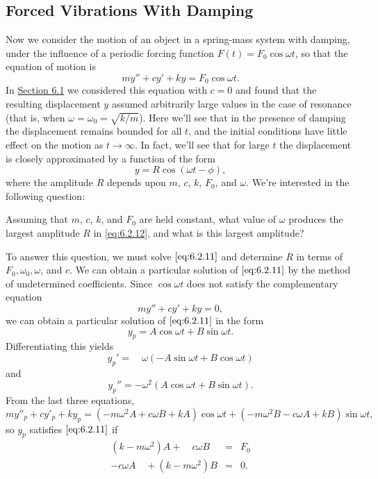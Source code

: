 \documentclass{ximera}
\begin{document}
\subsection*{Forced Vibrations With Damping}
 
Now we consider the motion of an object in a spring-mass system with
damping, under the influence of a periodic forcing function
$F(t)=F_0\cos\omega t$, so that the equation of motion is
\begin{equation}\label{eq:6.2.11}
my''+cy'+ky=F_0\cos\omega t.
\end{equation}
In \href{https://xerxes.ximera.org/differentialequations/main/springProblemsI/springProblemsI}{Section 6.1} we considered this equation with $c=0$ and
found that the resulting displacement $y$ assumed arbitrarily large
values in the case of resonance   (that is, when
$\omega=\omega_0=\sqrt{k/m}$). Here we'll see that in the presence
of damping the displacement remains bounded for all $t$, and the
initial conditions have little effect on the motion as $t\rightarrow\infty$.
In fact, we'll see that for large $t$ the displacement is closely
approximated by a function of the form
\begin{equation}\label{eq:6.2.12}
y=R\cos(\omega t-\phi),
\end{equation}
where the amplitude $R$ depends upon $m$, $c$, $k$, $F_0$, and
$\omega$. We're interested in the following question:
 
Assuming that $m$, $c$, $k$, and $F_0$ are
held constant, what value of $\omega$ produces the largest amplitude
$R$ in \eqref{eq:6.2.12}, and what is this largest amplitude?
 
To answer this question, we must solve $\eqref{eq:6.2.11}$ and determine $R$ in
terms of $F_0,\omega_0,\omega$, and $c$. We can obtain a particular solution of $\eqref{eq:6.2.11}$ by the method of undetermined coefficients.
Since $\cos\omega t$ does not satisfy the complementary equation
$$
my''+cy'+ky=0,
$$
we can obtain a particular solution of $\eqref{eq:6.2.11}$ in the form
\begin{equation}\label{eq:6.2.13}
y_p=A\cos\omega t+B\sin\omega t.
\end{equation}
Differentiating this yields
$$
y_p'=\quad\omega (-A\sin\omega t+B\cos\omega t)
$$
and
$$
y_p''=-\omega^2(A\cos\omega t+B\sin\omega t).
$$
 From the last three equations,
$$
my''_p+cy'_p+ky_p=(-m\omega^2A+c\omega B+kA)\cos\omega t+
(-m\omega^2 B-c\omega A+kB)\sin\omega t,
$$
so $y_p$ satisfies  $\eqref{eq:6.2.11}$ if
$$
\begin{array}{lll}
(k-m\omega^2) A+\quad c\omega B &=&F_0\\
-c\omega A\quad+(k-m\omega^2)B&=&0.
\end{array}
$$
 
\end{document}
